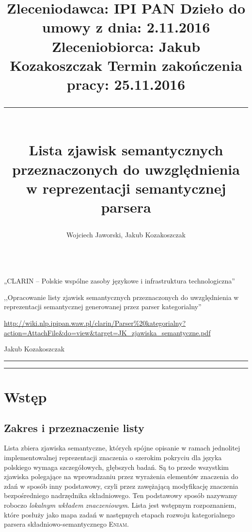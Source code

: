 \documentclass[a4paper, 12pt]{article}
\title{
\normalsize
\setlength{\topsep}{0pt} 
\noindent
Zleceniodawca: IPI PAN \hfill Dzieło do umowy z dnia: 2.11.2016 \\
Zleceniobiorca: Jakub Kozakoszczak \hfill Termin zakończenia pracy: 25.11.2016 \\
\rule{\linewidth}{2pt} \\[6pt] 
\huge Lista zjawisk semantycznych \\ przeznaczonych do uwzględnienia \\ w reprezentacji semantycznej parsera \eniam  \\[-2pt]}
\author{\Large Wojciech Jaworski, Jakub Kozakoszczak\\[6pt]
\hspace{-5pt}\rule{\linewidth}{2pt}  }
\date{}
\theoremstyle{remark}
\newcommand{\eniam}{\textsc{Eniam}}
\begin{document}
\maketitle
		
\vspace{-26pt}
\begin{description}
\setlength{\itemsep}{4pt} 
\setlength{\parskip}{0pt} 
	\item[Zrealizowane w ramach projektu:] „CLARIN -- Polskie wspólne zasoby językowe i infrastruktura technologiczna”
	\item[Tytuł pracy zamówionej:] ,,Opracowanie listy zjawisk semantycznych przeznaczonych do uwzględnienia w reprezentacji semantycznej generowanej przez parser kategorialny''
	\item[Adres dzieła:] \url{http://wiki.nlp.ipipan.waw.pl/clarin/Parser\%20kategorialny?action=AttachFile\&do=view\&target=JK_zjawiska_semantyczne.pdf}
	\item[Opracowanie dokumentu:] Jakub Kozakoszczak
\end{description}

\vspace{6pt}
\hrule
\vspace{-14pt}
\renewcommand\contentsname{\normalsize{}}
\tableofcontents
\vspace{20pt}
\hrule
\newpage

\section{Wstęp} %
{
\renewcommand\thesection{}
\renewcommand\thesubsection{}
\setcounter{subsection}{-1}
\subsection{Zakres i przeznaczenie listy} %
}
Lista zbiera zjawiska semantyczne, których spójne opisanie w ramach jednolitej implementowalnej reprezentacji znaczenia o szerokim pokryciu dla języka polskiego wymaga szczegółowych, głębszych badań.
Są to przede wszystkim zjawiska polegające na wprowadzaniu przez wyrażenia elementów znaczenia do zdań w sposób inny podstawowy, czyli przez zawężającą modyfikację znaczenia bezpośredniego nadrzędnika składniowego.
Ten podstawowy sposób nazywamy roboczo \emph{lokalnym wkładem znaczeniowym}.
Lista jest wstępnym rozpoznaniem, które posłuży jako mapa zadań w następnych etapach rozwoju kategorialnego parsera składniowo-semantycznego \eniam.

\end{document}
